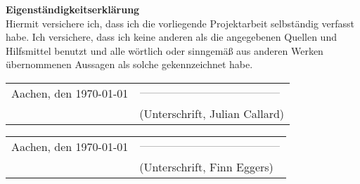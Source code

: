 {\Huge \bf Eigenständigkeitserklärung} \\

\vspace*{1cm}
Hiermit versichere ich, dass ich die vorliegende Projektarbeit selbständig verfasst habe. Ich versichere, dass ich keine anderen als die angegebenen Quellen und Hilfsmittel benutzt und alle wörtlich oder sinngemäß aus anderen Werken übernommenen Aussagen als solche gekennzeichnet habe.\\

\vspace*{1cm}\begin{tabular}{p{7cm}p{5cm}}
Aachen, den \today & $\rule{5cm}{0.01cm}$ \\
& (Unterschrift, Julian Callard)
\end{tabular}



\vspace*{1cm}\begin{tabular}{p{7cm}p{5cm}}
	Aachen, den \today & $\rule{5cm}{0.01cm}$ \\
	& (Unterschrift, Finn Eggers)
\end{tabular}




